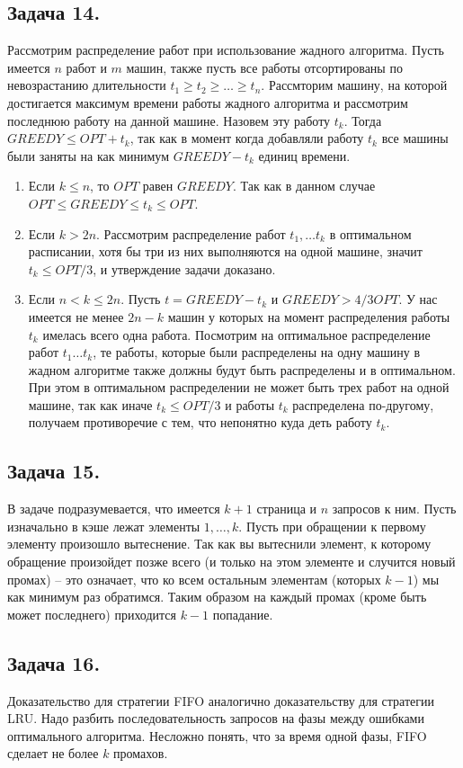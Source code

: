 \documentclass{article}
\begin{document}
\subsection*{Задача 14.}
Рассмотрим распределение работ при использование жадного алгоритма.
Пусть имеется $n$ работ и $m$ машин, также пусть все работы отсортированы
по невозрастанию длительности $t_1 \geq t_2 \geq \ldots \geq t_n$.
Рассмторим машину, на которой достигается максимум времени работы жадного
алгоритма и рассмотрим последнюю работу на данной машине. Назовем эту
работу $t_k$. Тогда $GREEDY \leq OPT + t_k$, так как в момент когда
добавляли работу $t_k$ все машины были заняты на как минимум $GREEDY - t_k$
единиц времени.
\begin{enumerate}
    \item
    Если $k \leq n$, то $OPT$ равен $GREEDY$.
    Так как в данном случае $OPT \leq GREEDY \leq t_k \leq OPT$.

    \item
    Если $k > 2n$. Рассмотрим распределение работ $t_1, \ldots t_k$
    в оптимальном расписании, хотя бы три из них выполняются на одной машине,
    значит $t_k \leq OPT/3$, и утверждение задачи доказано.

    \item
    Если $n < k \leq 2n$. Пусть $t = GREEDY - t_k$ и $GREEDY > 4/3 OPT$.
    У нас имеется не менее $2 n - k$ машин у которых на момент распределения
    работы $t_k$ имелась всего одна работа. Посмотрим на оптимальное
    распределение работ $t_1 \ldots t_k$, те работы, которые были
    распределены на одну машину в жадном алгоритме также должны будут
    быть распределены и в оптимальном. При этом в оптимальном
    распределении не может быть трех работ на одной машине, так как
    иначе $t_k \leq OPT / 3$ и работы $t_k$ распределена по-другому,
    получаем противоречие с тем, что непонятно куда деть работу $t_k$.
\end{enumerate}

\subsection*{Задача 15.}
В задаче подразумевается, что имеется $k+1$ страница и $n$ запросов к ним.
Пусть изначально в кэше лежат элементы $1, \ldots, k$. Пусть при обращении
к первому элементу произошло вытеснение. Так как вы вытеснили элемент,
к которому обращение произойдет позже всего (и только на этом элементе
и случится новый промах) -- это означает,
что ко всем остальным элементам (которых $k-1$) мы как минимум раз обратимся.
Таким образом на каждый промах (кроме быть может последнего) приходится $k-1$
попадание.

\subsection*{Задача 16.}
Доказательство для стратегии FIFO аналогично доказательству для стратегии LRU.
Надо разбить последовательность запросов на фазы между ошибками оптимального
алгоритма. Несложно понять, что за время одной фазы, FIFO сделает не более $k$
промахов.
\end{document}
